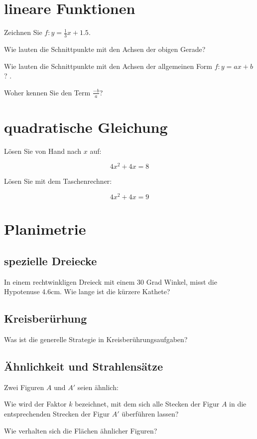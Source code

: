 \section{lineare Funktionen}
Zeichnen Sie $f: y=\frac{1}{3}x+1.5$.

Wie lauten die Schnittpunkte mit den Achsen der obigen Gerade?

Wie lauten die Schnittpunkte mit den Achsen der allgemeinen Form $f: y=ax+b$? .

Woher kennen Sie den Term $\frac{-b}{a}$?

\section{quadratische Gleichung}
Lösen Sie von Hand nach $x$ auf:

$$4x^2 +4x = 8$$

Lösen Sie mit dem Taschenrechner:

$$4x^2 + 4x = 9$$


\section{Planimetrie}
\subsection{spezielle Dreiecke}
In einem rechtwinkligen Dreieck mit einem 30 Grad Winkel, misst die Hypotenuse 4.6cm. Wie lange ist die kürzere Kathete? 

\subsection{Kreisberürhung}
Was ist die generelle Strategie in Kreisberührungsaufgaben?

\subsection{Ähnlichkeit und Strahlensätze}
Zwei Figuren $A$ und $A'$ seien ähnlich:

Wie wird der Faktor $k$ bezeichnet, mit dem sich alle Stecken der Figur $A$ in die entsprechenden Strecken der Figur $A'$ überführen lassen?

Wie verhalten sich die Flächen ähnlicher Figuren?



